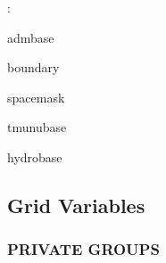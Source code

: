 \documentclass{article}
\begin{document}
: 

admbase

boundary

spacemask

tmunubase

hydrobase
\vspace{2mm}
\subsection*{Grid Variables}
\vspace{5mm}\subsubsection{PRIVATE GROUPS}

\vspace{5mm}
\end{document}
